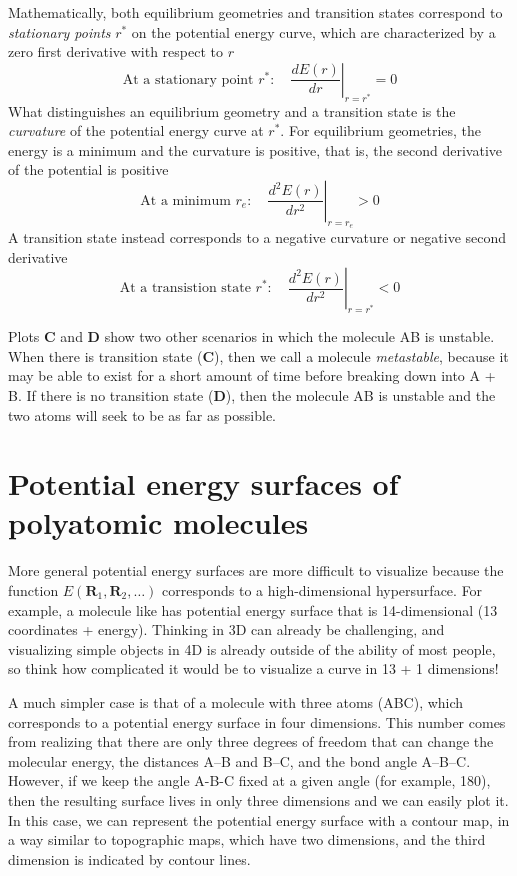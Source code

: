 \documentclass[../Main/notes.tex]{subfiles}
\begin{document}
Mathematically, both equilibrium geometries and transition states correspond to \emph{stationary points} $r^*$ on the potential energy curve, which are characterized by a zero first derivative with respect to $r$
\begin{equation}
\text{At a stationary point } r^*: \quad \left.\frac{d E(r)}{dr}\right|_{r = r^*} = 0
\end{equation}
What distinguishes an equilibrium geometry and a transition state is the \emph{curvature} of the potential energy curve at $r^*$.
For equilibrium geometries, the energy is a minimum and the curvature is positive, that is, the second derivative of the potential is positive
\begin{equation}
\text{At a minimum } r_e: \quad \left.\frac{d^2 E(r)}{dr^2}\right|_{r = r_e} > 0
\end{equation}
A transition state instead corresponds to a negative curvature or negative second derivative
\begin{equation}
\text{At a transistion state } r^*: \quad \left.\frac{d^2 E(r)}{dr^2}\right|_{r = r^*} < 0
\end{equation}

Plots \textbf{C} and \textbf{D} show two other scenarios in which the molecule AB is unstable.
When there is transition state (\textbf{C}), then we call a molecule \emph{metastable}, because it may be able to exist for a short amount of time before breaking down into A + B.
If there is no transition state (\textbf{D}), then the molecule AB is unstable and the two atoms will seek to be as far as possible.



\section{Potential energy surfaces of polyatomic molecules}

More general potential energy surfaces are more difficult to visualize because  the function $E(\mathbf{R}_1,  \mathbf{R}_2,\ldots)$ corresponds to a high-dimensional hypersurface.
For example, a molecule like  has potential energy surface that is 14-dimensional (13 coordinates + energy). Thinking in 3D can already be challenging, and visualizing simple objects in 4D is already outside of the ability of most people, so think how complicated it would be to visualize a curve in 13 + 1 dimensions! 

A much simpler case is that of a molecule with three atoms (ABC), which corresponds to a potential energy surface in four dimensions. This number comes from realizing that there are only three degrees of freedom that can change the molecular energy, the distances A--B and B--C, and the bond angle A--B--C.
However, if we keep the angle A-B-C fixed at a given angle (for example, 180\textdegree), then the resulting surface lives in only three dimensions and we can easily plot it.
In this case, we can represent the potential energy surface with a contour map, in a way similar to topographic maps, which have two dimensions, and the third dimension is indicated by contour lines.
\end{document}
